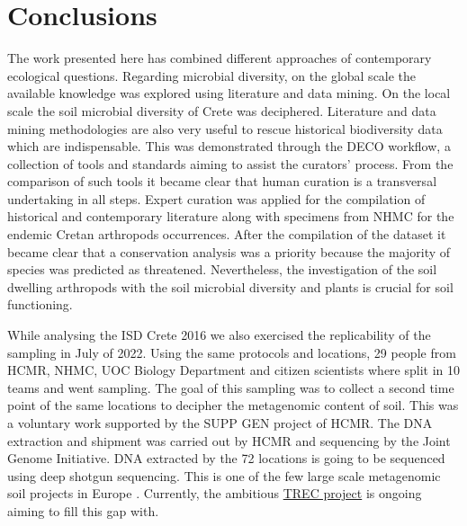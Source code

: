 % 
% 

\chapter{Conclusions}
\label{cha:conclusions}

The work presented here has combined different approaches of contemporary 
ecological questions. Regarding microbial diversity, on the global scale the available 
knowledge was explored using literature and data mining. On the local scale
the soil microbial diversity of Crete was deciphered. Literature and data mining 
methodologies are also very useful to rescue historical biodiversity data which are
indispensable. This was demonstrated through the DECO workflow, a collection
of tools and standards aiming to assist the curators' process. From the comparison
of such tools it became clear that human curation is a transversal undertaking in all steps.
Expert curation was applied for the compilation of historical and contemporary
literature along with specimens from NHMC for the endemic Cretan arthropods occurrences.
After the compilation of the dataset it became clear that a conservation analysis
was a priority because the majority of species was predicted as threatened.
Nevertheless, the investigation of the soil dwelling arthropods with the soil microbial diversity
and plants is crucial for soil functioning. 

While analysing the ISD Crete 2016 we also exercised the replicability of the sampling in July of 2022.
Using the same protocols and locations, 29 people from HCMR, NHMC, UOC Biology
Department and citizen scientists where split in 10 teams and went sampling. 
The goal of this sampling was to collect a second time point of the same locations
to decipher the metagenomic content of soil. This was a voluntary work supported 
by the SUPP GEN project of HCMR. The DNA extraction and shipment was carried out 
by HCMR and sequencing by the Joint Genome Initiative. DNA extracted by the 72 locations 
is going to be sequenced using deep shotgun sequencing. This is one of the few large scale metagenomic soil projects in
Europe \parencite{nayfach2021a-genomic, ma2023a-genomic}. Currently, 
the ambitious \href{https://www.embl.org/about/info/trec/}{TREC project} is
ongoing aiming to fill this gap with.

